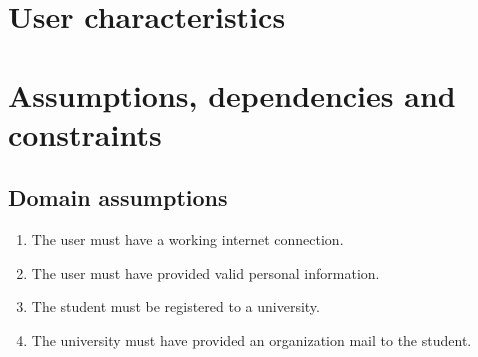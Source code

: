 \section{User characteristics}

\section{Assumptions, dependencies and constraints}

\subsection{Domain assumptions}

\begin{enumerate}[label=\textbf{DA\arabic* -}]
    \item The user must have a working internet connection.
    \item The user must have provided valid personal information.
    \item The student must be registered to a university.
    \item The university must have provided an organization mail to the student.
\end{enumerate}
